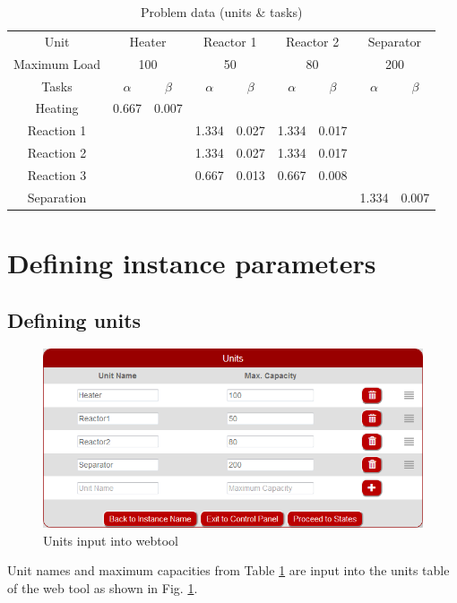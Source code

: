\begin{table}[htb]
\centering
\caption{Problem data (units \& tasks)}
\label{tab:tasks}
\begin{tabular}{@{}ccccccccc@{}}
\toprule
Unit         & \multicolumn{2}{c}{Heater} & \multicolumn{2}{c}{Reactor 1} & \multicolumn{2}{c}{Reactor 2} & \multicolumn{2}{c}{Separator} \\ \cmidrule(l){2-9} 
Maximum Load & \multicolumn{2}{c}{100}    & \multicolumn{2}{c}{50}        & \multicolumn{2}{c}{80}        & \multicolumn{2}{c}{200}       \\ \midrule
Tasks        & $\alpha$       & $\beta$       & $\alpha$         & $\beta$        & $\alpha$         & $\beta$        & $\alpha$         & $\beta$        \\ \cmidrule(l){2-9} 
Heating      & 0.667        & 0.007       &                &              &                &              &                &              \\
Reaction 1   &              &             & 1.334          & 0.027        & 1.334          & 0.017        &                &              \\
Reaction 2   &              &             & 1.334          & 0.027        & 1.334          & 0.017        &                &              \\
Reaction 3   &              &             & 0.667          & 0.013        & 0.667          & 0.008        &                &              \\
Separation   &              &             &                &              &                &              & 1.334          & 0.007        \\ \bottomrule
\end{tabular}
\end{table}

\section{Defining instance parameters}
\subsection{Defining units}
\begin{figure}[htbp]
\centering
\includegraphics[width=\linewidth]{Images/DefineUnits.png}
\caption{Units input into webtool}
\label{fig:defUnits}
\end{figure}
Unit names and maximum capacities from Table \ref{tab:tasks} are input into the units table of the web tool as shown in Fig. \ref{fig:defUnits}.

